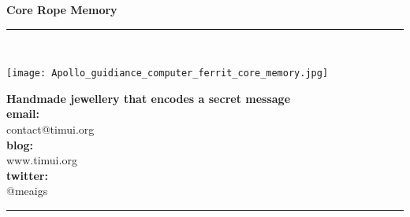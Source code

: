 \documentclass[11pt,a4paper]{memoir}
\begin{document}
    \begin{Spacing}{0.5}%
    \noindent
    \begin{center} \textbf{Core Rope Memory} \end{center}
    \rule{75mm}{1mm}\\
    \begin{minipage}[t]{28mm}
        \vspace{-1mm}%
        \hspace{1mm}%
        \texttt{[image: Apollo\_guidiance\_computer\_ferrit\_core\_memory.jpg]}
        \vspace{.4mm}%
    \end{minipage}
    \hspace{1mm}
    \begin{minipage}[t]{44mm}
        \vspace{-1mm}%
        \begin{flushright}
        {\scriptsize
        \textbf{Handmade jewellery that encodes a secret message}\\
        }
        {\tiny
\vspace{3mm}
            \textbf{email:} \\ contact@timui.org\\
\vspace{3mm}
            \textbf{blog:} \\ www.timui.org\\
\vspace{3mm}
            \textbf{twitter:} \\ @meaigs\\
\vspace*{2mm}
        }
        \end{flushright}
    \end{minipage}
    \rule{75mm}{1mm}
    \end{Spacing}
\end{document}
